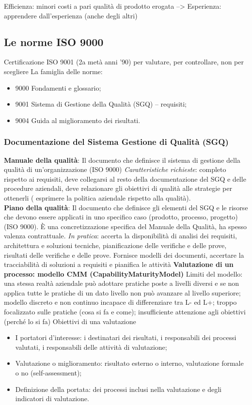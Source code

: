 Efficienza: minori costi a pari qualità di prodotto erogata --> Esperienza: apprendere dall'esperienza (anche degli altri)
\subsection{Le norme ISO 9000}
Certificazione ISO 9001 (2a metà anni '90) per valutare, per controllare, non per scegliere
La famiglia delle norme:
\begin{itemize}
\item 9000 Fondamenti e glossario; 
\item 9001 Sistema di Gestione della Qualità (SGQ) – requisiti;
\item 9004 Guida al miglioramento dei risultati.
\end{itemize}

\subsubsection{Documentazione del Sistema Gestione di Qualità (SGQ)}
\textbf{Manuale della qualità}: Il documento che definisce il sistema di gestione della qualità di un'organizzazione (ISO 9000)
\textit{Caratteristiche richieste}: completo rispetto ai requisiti, deve collegarsi al resto della documentazione del SGQ e delle procedure aziendali, deve relazionare gli obiettivi di qualità alle strategie per ottenerli ( esprimere la politica aziendale rispetto alla qualità).\\
\textbf{Piano della qualità}: Il documento che definisce gli elementi del SGQ e le risorse che devono essere applicati in uno specifico caso (prodotto, processo, progetto) (ISO 9000). \`E una concretizzazione specifica del Manuale della Qualità, ha spesso valenza contrattuale.
\textit{In pratica}: accerta la disponibilità di analisi dei requisiti, architettura e soluzioni tecniche, pianificazione delle verifiche e delle prove, risultati delle verifiche e delle prove. Fornisce modelli dei documenti, accertare la tracciabilità di soluzioni a requisiti e pianifica le attività
\textbf{Valutazione di un processo: modello CMM (CapabilityMaturityModel)}
Limiti del modello: una stessa realtà aziendale può adottare pratiche poste a livelli diversi e se non applica tutte le pratiche di un dato livello non può avanzare al livello superiore; modello discreto e non continuo incapace di differenziare tra L- ed L+; troppo focalizzato sulle pratiche (cosa si fa e come); insufficiente attenzione agli obiettivi (perché lo si fa)
Obiettivi di una valutazione
\begin{itemize}
\item I portatori d'interesse: i destinatari dei risultati, i responsabili dei processi valutati, i responsabili delle attività di valutazione;
\item Valutazione o miglioramento: risultato esterno o interno, valutazione formale o no (self-assessment);
\item Definizione della portata: dei processi inclusi nella valutazione e degli indicatori di valutazione.
\end{itemize}

